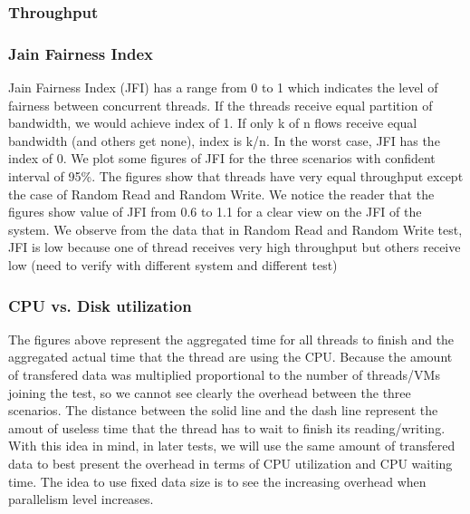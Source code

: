 \documentclass{acmsig}
\begin{document}
\subsubsection{Throughput}


\subsubsection{Jain Fairness Index}

Jain Fairness Index (JFI) has a range from 0 to 1 which indicates the level of fairness between concurrent threads. If the threads receive equal partition of bandwidth, we would achieve index of 1. If only k of n flows receive equal bandwidth (and others get none), index is k/n. In the worst case, JFI has the index of 0. We plot some figures of JFI for the three scenarios with confident interval of 95\%. The figures show that threads have very equal throughput except the case of Random Read and Random Write. We notice the reader that the figures show value of JFI from 0.6 to 1.1 for a clear view on the JFI of the system. We observe from the data that in Random Read and Random Write test, JFI is low because one of thread receives very high throughput but others receive low (need to verify with different system and different test) 

\subsubsection{CPU vs. Disk utilization}


The figures above represent the aggregated time for all threads to finish and the aggregated actual time that the thread are using the CPU. Because the amount of transfered data was multiplied proportional to the number of threads/VMs joining the test, so we cannot see clearly the overhead between the three scenarios. The distance between the solid line and the dash line represent the amout of useless time that the thread has to wait to finish its reading/writing. With this idea in mind, in later tests, we will use the same amount of transfered data to best present the overhead in terms of CPU utilization and CPU waiting time. The idea to use fixed data size is to see the increasing overhead when parallelism level increases.
\end{document}
